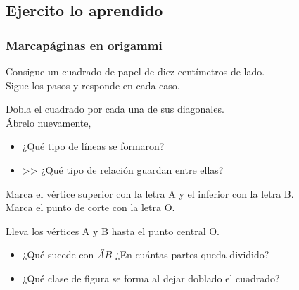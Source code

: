 \documentclass[10pt,twoside]{article}
\begin{document}
\subsection*{Ejercito lo aprendido}
\subsubsection*{Marcapáginas en origammi}
Consigue un cuadrado de papel de diez centímetros de lado.\\
Sigue los pasos y responde en cada caso.

\begin{minipage}{.35\textwidth}
\end{minipage}
\begin{minipage}{.6\textwidth}
Dobla el cuadrado por cada una de sus diagonales.\\
Ábrelo nuevamente,
\begin{itemize}
\item ¿Qué tipo de líneas se formaron?
\item >> ¿Qué tipo de relación guardan entre ellas?
\end{itemize}
Marca el vértice superior con la letra A y el inferior con la
letra B.\\
Marca el punto de corte con la letra O.
\end{minipage}

\begin{minipage}{.6\textwidth}
Lleva los vértices A y B hasta el punto central O.
\begin{itemize}
\item ¿Qué sucede con $\overleftrightarrow{AB}$ ¿En cuántas partes queda dividido?
\item ¿Qué clase de figura se forma al dejar doblado el  cuadrado?
\end{itemize}
\end{minipage}
\begin{minipage}{.35\textwidth}
\end{minipage}
\end{document}
